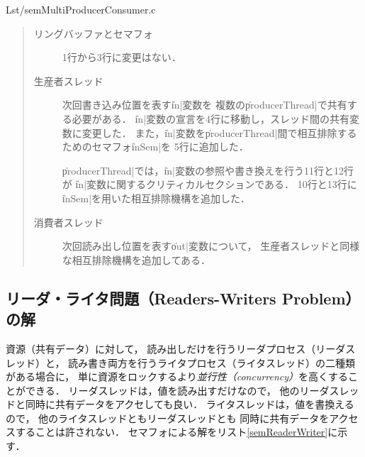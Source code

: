
                {Lst/semMultiProducerConsumer.c}

\begin{quote}
  \begin{description}
  \item [リングバッファとセマフォ]
    1行から3行に変更はない．

  \item [生産者スレッド]
    次回書き込み位置を表す\|in|変数を
    複数の\|producerThread|で共有する必要がある．
    \|in|変数の宣言を4行に移動し，スレッド間の共有変数に変更した．
    また，\|in|変数を\|producerThread|間で相互排除するためのセマフォ\|inSem|を
    5行に追加した．

    \|producerThread|では，\|in|変数の参照や書き換えを行う11行と12行が
    \|in|変数に関するクリティカルセクションである．
    10行と13行に\|inSem|を用いた相互排除機構を追加した．

  \item [消費者スレッド]
    次回読み出し位置を表す\|out|変数について，
    生産者スレッドと同様な相互排除機構を追加してある．
  \end{description}
\end{quote}

\subsection{リーダ・ライタ問題（Readers-Writers Problem）の解}
\label{readersWritersProglem}
資源（共有データ）に対して，
読み出しだけを行うリーダプロセス（リーダスレッド）と，
読み書き両方を行うライタプロセス（ライタスレッド）の二種類がある場合に，
単に資源をロックするより\emph{並行性（concurrency）}を高くすることができる．
リーダスレッドは，値を読み出すだけなので，
他のリーダスレッドと同時に共有データをアクセしても良い．
ライタスレッドは，値を書換えるので，
他のライタスレッドともリーダスレッドとも
同時に共有データをアクセスすることは許されない．
セマフォによる解をリスト\ref{semReaderWriter}に示す．



